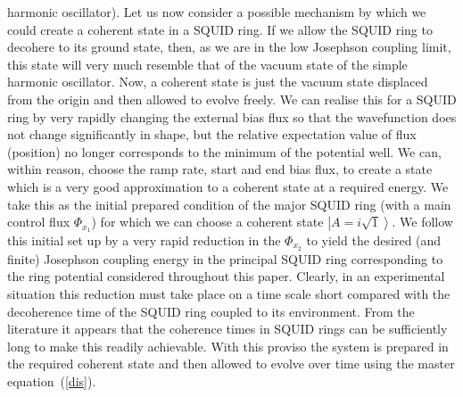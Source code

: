 \documentclass[twocolumn,a4paper,superscriptaddress,showpacs,floatfix,pra]{revtex4}
\begin{document}
harmonic  oscillator). Let  us now  consider a  possible  mechanism by
which we  could create a coherent state  in a SQUID ring.  If we allow
the SQUID ring to decohere to its ground state, then, as we are in the
low Josephson coupling limit, this  state will very much resemble that
of  the  vacuum state  of  the  simple  harmonic oscillator.   Now,  a
coherent state is just the  vacuum state displaced from the origin and
then allowed to evolve freely. We can realise this for a SQUID ring by
very rapidly changing the external  bias flux so that the wavefunction
does not  change significantly in shape, but  the relative expectation
value of flux  (position) no longer corresponds to  the minimum of the
potential well. We can, within reason, choose the ramp rate, start and
end bias flux, to create a state which is a very good approximation to
a coherent  state at a  required energy. We  take this as  the initial
prepared condition of the major  SQUID ring {(with a main control flux
$\Phi _{x_{1}}$)} for which we can choose a coherent state $\left\vert
A=i\sqrt{1}\right\rangle $. We follow this  {initial set up} by a very
rapid reduction  in the  {$\Phi _{x_{2}}$} to  yield the  desired (and
finite)  Josephson  coupling  energy   in  the  principal  SQUID  ring
corresponding to the ring  potential considered throughout this paper.
Clearly, in  an experimental situation this reduction  must take place
on a time scale short compared  with the decoherence time of the SQUID
ring    coupled   to    its   environment.    From    the   literature
\cite{Martinis2002,Zhou2002,Han2001,Mooij2003}  it  appears  that  the
coherence times in  SQUID rings can be sufficiently  long to make this
readily achievable. With this proviso the  system is prepared
in the  required coherent state and  then allowed to  evolve over time
using the master equation~(\ref{dis}).
\end{document}
